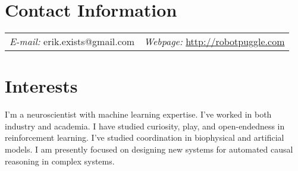 \documentclass[margin,line]{res}
\begin{document}
\newcommand{\link}[1]{\texttt{#1}}
\providecommand{\tightlist}{%
      \setlength{\itemsep}{0pt}\setlength{\parskip}{0pt}}



\begin{resume}
\section{\sc Contact Information}
\vspace{.05in}
\begin{tabular}{@{}p{2in}p{4in}}
{\it E-mail:}  erik.exists@gmail.com   & {\it Webpage:} \href{http://robotpuggle.com}{http://robotpuggle.com} \\
\end{tabular}


\section{\sc Interests}
I'm a neuroscientist with machine learning expertise. I've worked in both industry and academia. I have studied curiosity, play, and open-endedness in reinforcement learning. I've studied coordination in biophysical and artificial models. I am presently focused on designing new systems for automated causal reasoning in complex systems.







\end{resume}
\end{document}
